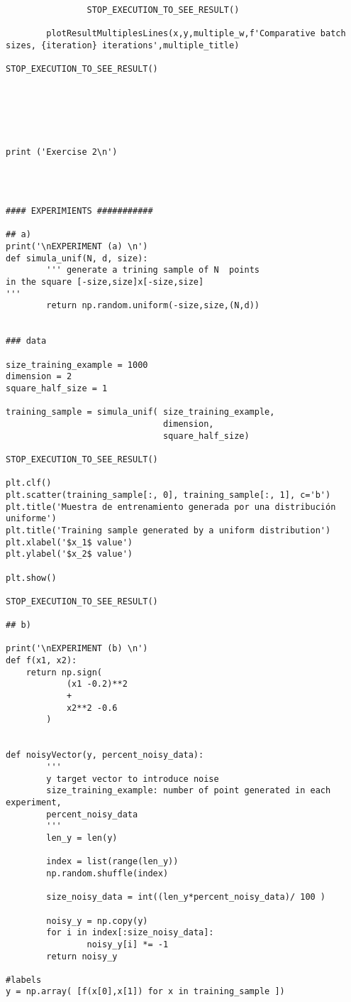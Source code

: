 \begin{verbatim}
                STOP_EXECUTION_TO_SEE_RESULT()

        plotResultMultiplesLines(x,y,multiple_w,f'Comparative batch sizes, {iteration} iterations',multiple_title)        

STOP_EXECUTION_TO_SEE_RESULT()
 





print ('Exercise 2\n')




#### EXPERIMIENTS ###########

## a)
print('\nEXPERIMENT (a) \n')
def simula_unif(N, d, size):
        ''' generate a trining sample of N  points
in the square [-size,size]x[-size,size]
'''
        return np.random.uniform(-size,size,(N,d))


### data

size_training_example = 1000
dimension = 2
square_half_size = 1

training_sample = simula_unif( size_training_example,
                               dimension,
                               square_half_size)

STOP_EXECUTION_TO_SEE_RESULT()

plt.clf()
plt.scatter(training_sample[:, 0], training_sample[:, 1], c='b')
plt.title('Muestra de entrenamiento generada por una distribución uniforme')
plt.title('Training sample generated by a uniform distribution')
plt.xlabel('$x_1$ value')
plt.ylabel('$x_2$ value')

plt.show()

STOP_EXECUTION_TO_SEE_RESULT()

## b)

print('\nEXPERIMENT (b) \n')
def f(x1, x2):
	return np.sign(
            (x1 -0.2)**2
            +
            x2**2 -0.6
        ) 


def noisyVector(y, percent_noisy_data):
        '''
        y target vector to introduce noise
        size_training_example: number of point generated in each experiment,
        percent_noisy_data
        '''
        len_y = len(y)
        
        index = list(range(len_y))
        np.random.shuffle(index)
        
        size_noisy_data = int((len_y*percent_noisy_data)/ 100 )

        noisy_y = np.copy(y)
        for i in index[:size_noisy_data]:
                noisy_y[i] *= -1
        return noisy_y

#labels 
y = np.array( [f(x[0],x[1]) for x in training_sample ])



\end{verbatim}
